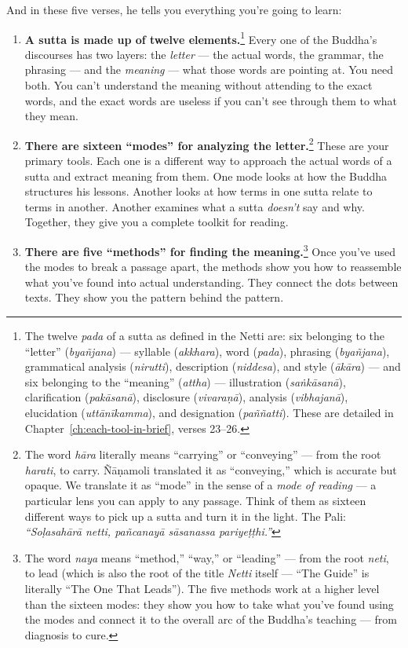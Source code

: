 And in these five verses, he tells you everything you're going to learn:

\begin{enumerate}
\item \textbf{A sutta is made up of twelve elements.}\footnote{The twelve \textit{pada} of a sutta as defined in the Netti are: six belonging to the ``letter'' (\textit{byañjana}) --- syllable (\textit{akkhara}), word (\textit{pada}), phrasing (\textit{byañjana}), grammatical analysis (\textit{nirutti}), description (\textit{niddesa}), and style (\textit{ākāra}) --- and six belonging to the ``meaning'' (\textit{attha}) --- illustration (\textit{saṅkāsanā}), clarification (\textit{pakāsanā}), disclosure (\textit{vivaraṇā}), analysis (\textit{vibhajanā}), elucidation (\textit{uttānīkamma}), and designation (\textit{paññatti}). These are detailed in Chapter~\ref{ch:each-tool-in-brief}, verses 23--26.} Every one of the Buddha's discourses has two layers: the \textit{letter} --- the actual words, the grammar, the phrasing --- and the \textit{meaning} --- what those words are pointing at. You need both. You can't understand the meaning without attending to the exact words, and the exact words are useless if you can't see through them to what they mean.

\item \textbf{There are sixteen ``modes'' for analyzing the letter.}\footnote{The word \textit{hāra} literally means ``carrying'' or ``conveying'' --- from the root \textit{harati}, to carry. Ñāṇamoli translated it as ``conveying,'' which is accurate but opaque. We translate it as ``mode'' in the sense of a \textit{mode of reading} --- a particular lens you can apply to any passage. Think of them as sixteen different ways to pick up a sutta and turn it in the light. The Pali: \textit{``Soḷasahārā netti, pañcanayā sāsanassa pariyeṭṭhi.''}} These are your primary tools. Each one is a different way to approach the actual words of a sutta and extract meaning from them. One mode looks at how the Buddha structures his lessons. Another looks at how terms in one sutta relate to terms in another. Another examines what a sutta \textit{doesn't} say and why. Together, they give you a complete toolkit for reading.

\item \textbf{There are five ``methods'' for finding the meaning.}\footnote{The word \textit{naya} means ``method,'' ``way,'' or ``leading'' --- from the root \textit{neti}, to lead (which is also the root of the title \textit{Netti} itself --- ``The Guide'' is literally ``The One That Leads''). The five methods work at a higher level than the sixteen modes: they show you how to take what you've found using the modes and connect it to the overall arc of the Buddha's teaching --- from diagnosis to cure.} Once you've used the modes to break a passage apart, the methods show you how to reassemble what you've found into actual understanding. They connect the dots between texts. They show you the pattern behind the pattern.


\end{enumerate}
